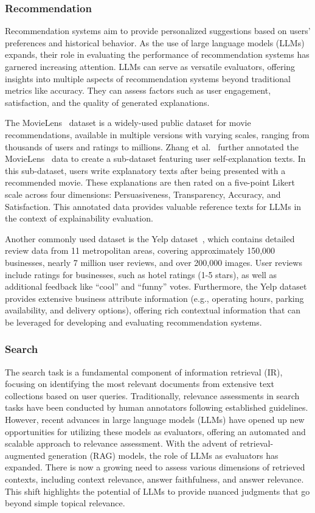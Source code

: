 \subsubsection{Recommendation}
\label{sec:Recommendation}
Recommendation systems aim to provide personalized suggestions based on users' preferences and historical behavior. As the use of large language models (LLMs) expands, their role in evaluating the performance of recommendation systems has garnered increasing attention. LLMs can serve as versatile evaluators, offering insights into multiple aspects of recommendation systems beyond traditional metrics like accuracy. They can assess factors such as user engagement, satisfaction, and the quality of generated explanations.

The MovieLens~\cite{harper2015movielens} dataset is a widely-used public dataset for movie recommendations, available in multiple versions with varying scales, ranging from thousands of users and ratings to millions. Zhang et al.~\cite{zhang2024large} further annotated the MovieLens~\cite{harper2015movielens} data to create a sub-dataset featuring user self-explanation texts. In this sub-dataset, users write explanatory texts after being presented with a recommended movie. These explanations are then rated on a five-point Likert scale across four dimensions: Persuasiveness, Transparency, Accuracy, and Satisfaction. This annotated data provides valuable reference texts for LLMs in the context of explainability evaluation.

Another commonly used dataset is the Yelp dataset~\cite{asghar2016yelp}, which contains detailed review data from 11 metropolitan areas, covering approximately 150,000 businesses, nearly 7 million user reviews, and over 200,000 images. User reviews include ratings for businesses, such as hotel ratings (1-5 stars), as well as additional feedback like ``cool'' and ``funny'' votes. Furthermore, the Yelp dataset provides extensive business attribute information (e.g., operating hours, parking availability, and delivery options), offering rich contextual information that can be leveraged for developing and evaluating recommendation systems.

\subsubsection{Search}
\label{sec:Search}
The search task is a fundamental component of information retrieval (IR), focusing on identifying the most relevant documents from extensive text collections based on user queries. Traditionally, relevance assessments in search tasks have been conducted by human annotators following established guidelines. However, recent advances in large language models (LLMs) have opened up new opportunities for utilizing these models as evaluators, offering an automated and scalable approach to relevance assessment.
With the advent of retrieval-augmented generation (RAG) models, the role of LLMs as evaluators has expanded. There is now a growing need to assess various dimensions of retrieved contexts, including context relevance, answer faithfulness, and answer relevance. This shift highlights the potential of LLMs to provide nuanced judgments that go beyond simple topical relevance.

